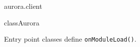 \begin{texdocpackage}{aurora.client}
\label{texdoclet:aurora.client}

\begin{texdocclass}{class}{Aurora}
\label{texdoclet:aurora.client.Aurora}
\begin{texdocclassintro}
Entry point classes define \texttt{onModuleLoad()}.\end{texdocclassintro}
\begin{texdocclassconstructors}
\end{texdocclassconstructors}
\begin{texdocclassmethods}
\end{texdocclassmethods}
\end{texdocclass}


\end{texdocpackage}



